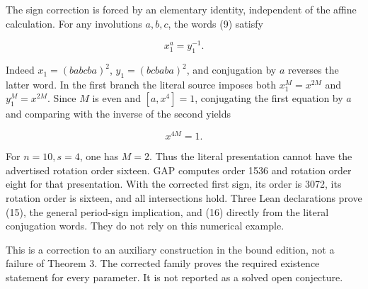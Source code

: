 The sign correction is forced by an elementary identity, independent
of the affine calculation. For any involutions \(a,b,c\), the words (9)
satisfy

\[x_1^a=y_1^{-1}.\tag{15}\]

Indeed \(x_1=(b a b c b a)^2\), \(y_1=(b c b a b a)^2\), and conjugation by \(a\)
reverses the latter word. In the first branch the literal source imposes
both \(x_1^M=x^{2M}\) and \(y_1^M=x^{2M}\). Since \(M\) is even and
\([a,x^4]=1\), conjugating the first equation by \(a\) and comparing with
the inverse of the second yields

\[x^{4M}=1.\tag{16}\]

For \(n=10,s=4\), one has \(M=2\). Thus the literal presentation cannot
have the advertised rotation order sixteen. GAP computes order 1536
and rotation order eight for that presentation. With the corrected
first sign, its order is 3072, its rotation order is sixteen, and all
intersections hold. Three Lean declarations prove (15), the general
period-sign implication, and (16) directly from the literal conjugation
words. They do not rely on this numerical example.

This is a correction to an auxiliary construction in the bound edition,
not a failure of Theorem 3. The corrected family proves the required
existence statement for every parameter. It is not reported as a solved
open conjecture.
